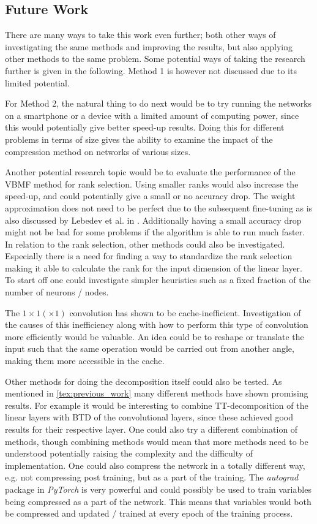 \subsection{Future Work} \label{tex:future_work}
There are many ways to take this work even further; both other ways of investigating the same methods and improving the results, but also applying other methods to the same problem. Some potential ways of taking the research further is given in the following. Method 1 is however not discussed due to its limited potential.

For Method 2, the natural thing to do next would be to try running the networks on a smartphone or a device with a limited amount of computing power, since this would potentially give better speed-up results. Doing this for different problems in terms of size gives the ability to examine the impact of the compression method on networks of various sizes.

Another potential research topic would be to evaluate the performance of the VBMF method for rank selection. Using smaller ranks would also increase the speed-up, and could potentially give a small or no accuracy drop. The weight approximation does not need to be perfect due to the subsequent fine-tuning as is also discussed by Lebedev et al. in \cite{Lebedev2015}. Additionally having a small accuracy drop might not be bad for some problems if the algorithm is able to run much faster. In relation to the rank selection, other methods could also be investigated. Especially there is a need for finding a way to standardize the rank selection making it able to calculate the rank for the input dimension of the linear layer. To start off one could investigate simpler heuristics such as a fixed fraction of the number of neurons / nodes.

The $1\times 1 (\times 1)$ convolution has shown to be cache-inefficient. Investigation of the causes of this inefficiency along with how to perform this type of convolution more efficiently would be valuable. An idea could be to reshape or translate the input such that the same operation would be carried out from another angle, making them more accessible in the cache.

Other methods for doing the decomposition itself could also be tested. As mentioned in \autoref{tex:previous_work} many different methods have shown promising results. For example it would be interesting to combine TT-decomposition of the linear layers with BTD of the convolutional layers, since these achieved good results for their respective layer. One could also try a different combination of methods, though combining methods would mean that more methods need to be understood potentially raising the complexity and the difficulty of implementation. One could also compress the network in a totally different way, e.g. not compressing post training, but as a part of the training. The \textit{autograd} package in \textit{PyTorch} is very powerful and could possibly be used to train variables being compressed as a part of the network. This means that variables would both be compressed and updated / trained at every epoch of the training process.